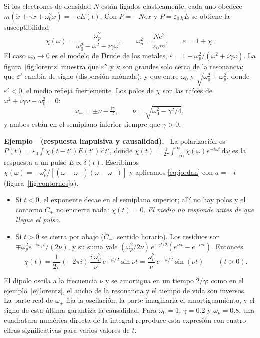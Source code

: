 \documentclass[11pt,letterpaper]{article}
\newcounter{ejemplo}
\newenvironment{ejemplo}[1]{%
  \refstepcounter{ejemplo}%
  \begin{ejemplobox}\textbf{Ejemplo~\theejemplo\ (#1).}\ }%
  {\end{ejemplobox}}
\newcommand{\dd}{\mathrm{d}}
\newcommand{\eps}{\varepsilon}
\begin{document}
Si los electrones de densidad $N$ están ligados elásticamente, cada uno obedece
$m(\ddot x+\gamma\dot x+\omega_0^2x)=-eE(t)$. Con $P=-Nex$ y $P=\eps_0\chi E$
se obtiene la susceptibilidad
\begin{equation}\label{eq:lorentz}
  \chi(\omega)=\frac{\omega_p^2}{\omega_0^2-\omega^2-i\gamma\omega},\qquad
  \omega_p^2=\frac{Ne^2}{\eps_0 m},\qquad \eps=1+\chi.
\end{equation}
El caso $\omega_0\to0$ es el modelo de Drude de los metales,
$\eps=1-\omega_p^2/(\omega^2+i\gamma\omega)$. La figura~\ref{fig:lorentz}
muestra que $\eps''$ y $\kappa$ son grandes solo cerca de la resonancia; que
$\eps'$ cambia de signo (dispersión anómala); y que entre $\omega_0$ y
$\sqrt{\omega_0^2+\omega_p^2}$, donde $\eps'<0$, el medio refleja fuertemente.
Los polos de $\chi$ son las raíces de $\omega^2+i\gamma\omega-\omega_0^2=0$:
\begin{equation}\label{eq:polos}
  \omega_\pm=\pm\nu-\tfrac{i\gamma}{2},\qquad
  \nu=\sqrt{\omega_0^2-\gamma^2/4},
\end{equation}
y ambos están en el semiplano inferior siempre que $\gamma>0$.

\begin{ejemplo}{respuesta impulsiva y causalidad}\label{ej:impulso}
La polarización es $P(t)=\eps_0\int\chi(t-t')E(t')\,\dd t'$, donde
$\chi(t)=\frac{1}{2\pi}\int_{-\infty}^{\infty}\chi(\omega)e^{-i\omega t}\,\dd\omega$
es la respuesta a un pulso $E\propto\delta(t)$. Escribimos
$\chi(\omega)=-\omega_p^2/[(\omega-\omega_+)(\omega-\omega_-)]$ y aplicamos
\eqref{eq:jordan} con $a=-t$ (figura~\ref{fig:contornos}a).
\begin{itemize}
  \item Si $t<0$, el exponente decae en el semiplano superior; allí no hay
  polos y el contorno $C_+$ no encierra nada: $\chi(t)=0$. \emph{El medio no
  responde antes de que llegue el pulso.}
  \item Si $t>0$ se cierra por abajo ($C_-$, sentido horario). Los residuos son
  $\mp\omega_p^2e^{-i\omega_\pm t}/(2\nu)$, y su suma vale
  $(\omega_p^2/2\nu)\,e^{-\gamma t/2}(e^{i\nu t}-e^{-i\nu t})$. Entonces
  \[
    \chi(t)=\frac{1}{2\pi}(-2\pi i)\,\frac{i\,\omega_p^2}{\nu}\,
    e^{-\gamma t/2}\sin\nu t
    =\frac{\omega_p^2}{\nu}\,e^{-\gamma t/2}\sin(\nu t)\qquad(t>0).
  \]
\end{itemize}
El dipolo oscila a la frecuencia $\nu$ y se amortigua en un tiempo $2/\gamma$:
como en el ejemplo~\ref{ej:lorentz}, el ancho de la resonancia y el tiempo de
vida son inversos. La parte real de $\omega_\pm$ fija la oscilación, la parte
imaginaria el amortiguamiento, y el signo de esta última garantiza la
causalidad. Para $\omega_0=1$, $\gamma=0.2$ y $\omega_p=0.8$, una cuadratura
numérica directa de la integral reproduce esta expresión con cuatro cifras
significativas para varios valores de $t$.
\end{ejemplo}
\end{document}
